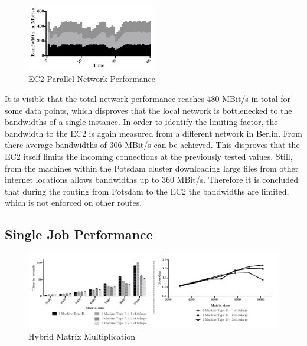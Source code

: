 \begin{figure}[!htb]
	\includegraphics[width=0.5\textwidth]{images/ec2_stacked_network_performance.pdf}
	\centering
	\caption{EC2 Parallel Network Performance}
	\label{img:EC2 Parallel Network Performance}
\end{figure}

It is visible that the total network performance reaches 480 MBit/s in total for some data points, which disproves that the local network is bottlenecked to the bandwidths of a single instance. In order to identify the limiting factor, the bandwidth to the EC2 is again measured from a different network in Berlin. From there average bandwidths of 306 MBit/s can be achieved. This disproves that the EC2 itself limits the incoming connections at the previously tested values. Still, from the machines within the Potsdam cluster downloading large files from other internet locations allows bandwidths up to 360 MBit/s. Therefore it is concluded that during the routing from Potsdam to the EC2 the bandwidths are limited, which is not enforced on other routes.

\subsection*{Single Job Performance}

\begin{figure}[H]
	\includegraphics[width=1.0\textwidth]{images/hybrid_matrix_multiplication.pdf}
	\centering
	\caption{Hybrid Matrix Multiplication}
	\label{img:hybrid_matrix_multiplication}
\end{figure}


